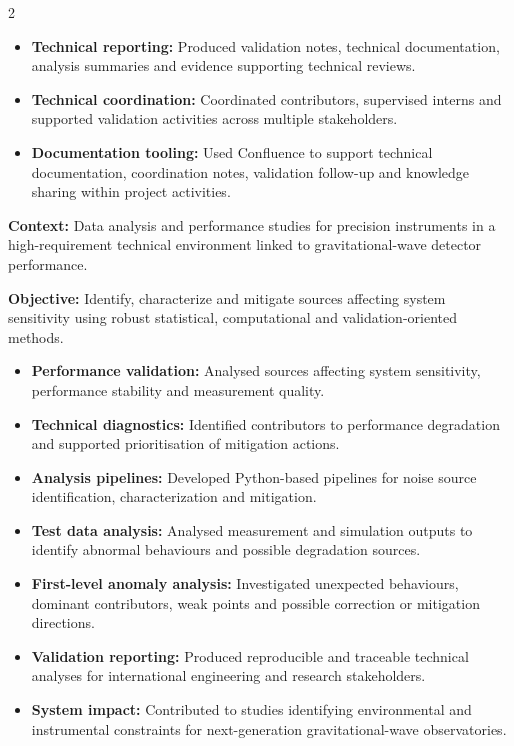 \documentclass[8pt,a4paper,ragged2e,withhyper]{../_shared/altacv}
\begin{document}
\begin{paracol}{2}
\begin{itemize}
  \item \textbf{Technical reporting:} Produced validation notes, technical documentation, analysis summaries and evidence supporting technical reviews.
  \item \textbf{Technical coordination:} Coordinated contributors, supervised interns and supported validation activities across multiple stakeholders.
  \item \textbf{Documentation tooling:} Used Confluence to support technical documentation, coordination notes, validation follow-up and knowledge sharing within project activities.
\end{itemize}

\divider


\textbf{Context:} Data analysis and performance studies for precision instruments in a high-requirement technical environment linked to gravitational-wave detector performance.

\textbf{Objective:} Identify, characterize and mitigate sources affecting system sensitivity using robust statistical, computational and validation-oriented methods.

\begin{itemize}
  \item \textbf{Performance validation:} Analysed sources affecting system sensitivity, performance stability and measurement quality.
  \item \textbf{Technical diagnostics:} Identified contributors to performance degradation and supported prioritisation of mitigation actions.
  \item \textbf{Analysis pipelines:} Developed Python-based pipelines for noise source identification, characterization and mitigation.
  \item \textbf{Test data analysis:} Analysed measurement and simulation outputs to identify abnormal behaviours and possible degradation sources.
  \item \textbf{First-level anomaly analysis:} Investigated unexpected behaviours, dominant contributors, weak points and possible correction or mitigation directions.
  \item \textbf{Validation reporting:} Produced reproducible and traceable technical analyses for international engineering and research stakeholders.
  \item \textbf{System impact:} Contributed to studies identifying environmental and instrumental constraints for next-generation gravitational-wave observatories.
\end{itemize}


\end{paracol}
\end{document}
